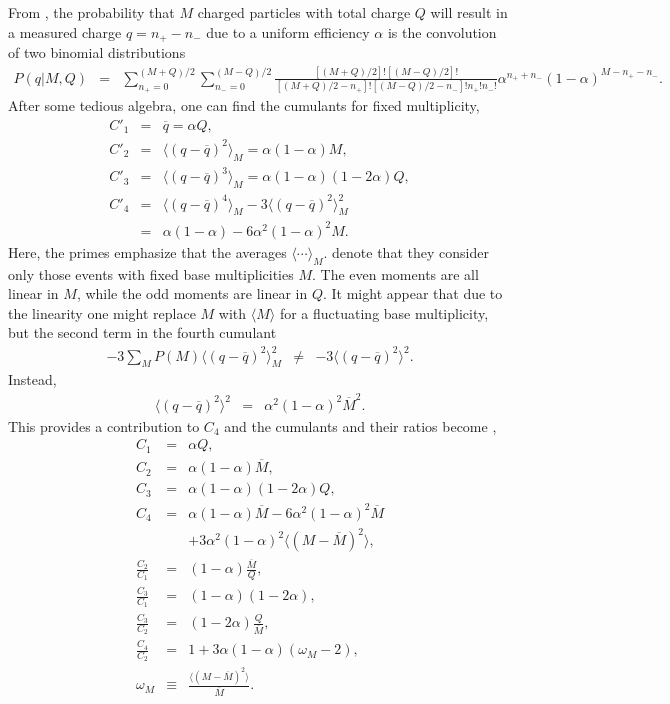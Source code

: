 From \cite{Savchuk:2019xfg}, the probability that $M$ charged particles with total charge $Q$ will result in a measured charge $q=n_+ - n_-$ due to a uniform efficiency $\alpha$ is the convolution of two binomial distributions
\begin{eqnarray}
P(q|M,Q)&=&\sum_{n_+=0}^{(M+Q)/2}\sum_{n_-=0}^{(M-Q)/2}\frac{[(M+Q)/2]![(M-Q)/2]!}{[(M+Q)/2-n_+]![(M-Q)/2-n_-]!n_+!n_-!}
\alpha^{n_++n_-}(1-\alpha)^{M-n_+-n_-}.
\end{eqnarray}
After some tedious algebra, one can find the cumulants for fixed multiplicity,
\begin{eqnarray}
C'_1&=&\overline{q}=\alpha Q,\\
\nonumber
C'_2&=&\langle (q-\overline{q})^2\rangle_M = \alpha(1-\alpha)M,\\
\nonumber
C'_3&=&\langle (q-\overline{q})^3\rangle_M = \alpha(1-\alpha)(1-2\alpha)Q,\\
\nonumber
C'_4&=&\langle(q-\overline{q})^4\rangle_M -3\langle(q-\overline{q})^2\rangle_M^2\\
\nonumber
&=&\alpha(1-\alpha)-6\alpha^2(1-\alpha)^2M.
\end{eqnarray}
Here, the primes emphasize that the averages $\langle\cdots\rangle_M$. denote that they consider only those events with fixed base multiplicities $M$. The even moments are all linear in $M$, while the odd moments are linear in $Q$. It might appear that due to the linearity one might replace $M$ with $\langle M\rangle$ for a fluctuating base multiplicity, but the second term in the fourth cumulant
\begin{eqnarray}
-3\sum_M P(M) \langle(q-\overline{q})^2\rangle_M^2 &\ne&
-3\langle(q-\overline{q})^2\rangle^2.
\end{eqnarray}
Instead,
\begin{eqnarray}
\langle(q-\overline{q})^2\rangle^2&=&\alpha^2(1-\alpha)^2\overline{M}^2.
\end{eqnarray}
This provides a contribution to $C_4$ and the cumulants and their ratios become \cite{Savchuk:2019xfg},
\begin{eqnarray}
\label{eq:savchuk}
C_1&=&\alpha Q,\\
\nonumber
C_2&=&\alpha(1-\alpha)\overline{M},\\
\nonumber
C_3&=&\alpha(1-\alpha)(1-2\alpha)Q,\\
\nonumber
C_4&=&\alpha(1-\alpha)\overline{M}-6\alpha^2(1-\alpha)^2\overline{M}\\
\nonumber
&&+3 \alpha^2 (1-\alpha)^2\langle(M-\overline{M})^2\rangle,\\
\nonumber
\frac{C_2}{C_1}&=&(1-\alpha)\frac{\overline{M}}{Q},\\
\nonumber
\frac{C_3}{C_1}&=&(1-\alpha)(1-2\alpha),\\
\nonumber
\frac{C_3}{C_2}&=&(1-2\alpha)\frac{Q}{\overline{M}},\\
\nonumber
\frac{C_4}{C_2}&=&1+3\alpha(1-\alpha)(\omega_M-2),\\
\nonumber
\omega_M&\equiv&\frac{\langle(M-\overline{M})^2\rangle}{\overline{M}}.
\end{eqnarray}
